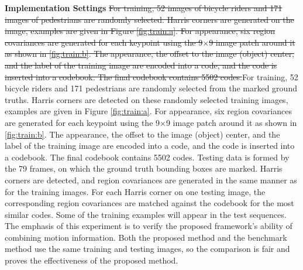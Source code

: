 \documentclass{mva2011}
\begin{document}
\textbf{Implementation Settings}
\sout{For training, 52 images of bicycle riders and 171 images of pedestrians are randomly selected. Harris corners are generated on the image, examples are given in Figure \ref{fig:train:a}. For appearance, six region covariances are generated for each keypoint using the 9$\times$9 image patch around it as shown in \ref{fig:train:b}. The appearance, the offset to the image (object) center, and the label of the training image are encoded into a code, and the code is inserted into a codebook. The final codebook contains 5502 codes.}{\color{red}For training, 52  bicycle riders and 171  pedestrians are randomly selected from the marked ground truths. Harris corners are detected on these randomly selected training images, examples are given in Figure \ref{fig:train:a}. For appearance, six region covariances are generated for each keypoint using the 9$\times$9 image patch around it as shown in \ref{fig:train:b}. The appearance, the offset to the image (object) center, and the label of the training image are encoded into a code, and the code is inserted into a codebook. The final codebook contains 5502 codes. Testing data is formed by the 79 frames, on which the ground truth bounding boxes are marked. Harris corners are detected, and region covariances are generated in the same manner as for the training images. For each Harris corner on one testing image, the corresponding region covariances are matched against the codebook for the most similar codes. Some of the training examples will
appear in the test sequences. The
emphasis of this experiment is  to verify the proposed
framework's ability of combining motion information. Both
the proposed method and the benchmark method use the same
training and testing images, so the comparison is fair
and proves the effectiveness of the proposed method.}
\end{document}
